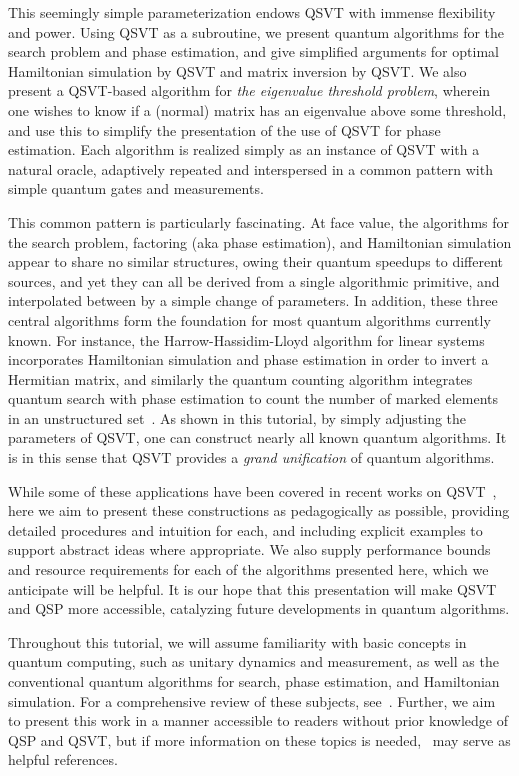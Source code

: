 \documentclass[aps,pra,showpacs,notitlepage,twocolumn,superscriptaddress,nofootinbib]{revtex4-1}
\begin{document}
    This seemingly simple parameterization endows QSVT with immense flexibility and power. Using QSVT as a subroutine, we present quantum algorithms for the search problem and phase estimation, and give simplified arguments for optimal Hamiltonian simulation by QSVT and matrix inversion by QSVT. We also present a QSVT-based algorithm for \emph{the eigenvalue threshold problem}, wherein one wishes to know if a (normal) matrix has an eigenvalue above some threshold, and use this to simplify the presentation of the use of QSVT for phase estimation. Each algorithm is realized simply as an instance of QSVT with a natural oracle, adaptively repeated and interspersed in a common pattern with simple quantum gates and measurements. 
    
    This common pattern is particularly fascinating. At face value, the algorithms for the search problem, factoring (aka phase estimation), and Hamiltonian simulation appear to share no similar structures, owing their quantum speedups to different sources, and yet they can all be derived from a single algorithmic primitive, and interpolated between by a simple change of parameters. In addition, these three central algorithms form the foundation for most quantum algorithms currently known. For instance, the Harrow-Hassidim-Lloyd algorithm for linear systems~\cite{Harrow_2009} incorporates Hamiltonian simulation and phase estimation in order to invert a Hermitian matrix, and similarly the quantum counting algorithm integrates quantum search with phase estimation to count the number of marked elements in an unstructured set~\cite{Brassard_1998}. As shown in this tutorial, by simply adjusting the parameters of QSVT, one can construct nearly all known quantum algorithms. It is in this sense that QSVT provides a \emph{grand unification} of quantum algorithms. 
    
    While some of these applications have been covered in recent works on QSVT~\cite{Gily_n_2019, rall2021faster}, here we aim to present these constructions as pedagogically as possible, providing detailed procedures and intuition for each, and including explicit examples to support abstract ideas where appropriate. We also supply performance bounds and resource requirements for each of the algorithms presented here, which we anticipate will be helpful.  It is our hope that this presentation will make QSVT and QSP more accessible, catalyzing future developments in quantum algorithms.
    
    Throughout this tutorial, we will assume familiarity with basic concepts in quantum computing, such as unitary dynamics and measurement, as well as the conventional quantum algorithms for search, phase estimation, and Hamiltonian simulation. For a comprehensive review of these subjects, see~\cite{nielsen2010quantum, preskill1998lecture, kitaev2002classical}. Further, we aim to present this work in a manner accessible to readers without prior knowledge of QSP and QSVT, but if more information on these topics is needed,~\cite{low2017quantum, Low_2016, gilyen2019quantum, Gily_n_2019} may serve as helpful references.
    
\end{document}

